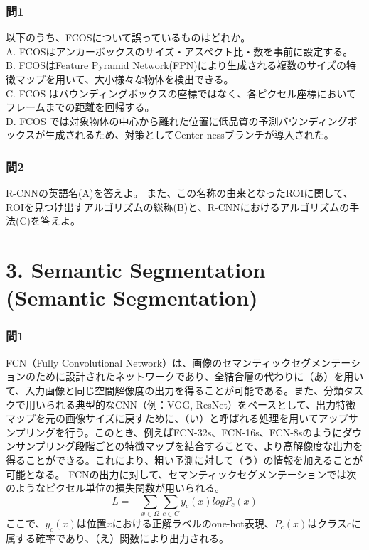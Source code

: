 \documentclass[
  letterpaper,
  DIV=11,
  numbers=noendperiod]{scrreprt}
\begin{document}
\subsection{問1}\label{ux554f1-3}

以下のうち、FCOSについて誤っているものはどれか。\\
A. FCOSはアンカーボックスのサイズ・アスペクト比・数を事前に設定する。\\
B. FCOSはFeature Pyramid
Network(FPN)により生成される複数のサイズの特徴マップを用いて、大小様々な物体を検出できる。\\
C. FCOS
はバウンディングボックスの座標ではなく、各ピクセル座標においてフレームまでの距離を回帰する。\\
D. FCOS
では対象物体の中心から離れた位置に低品質の予測バウンディングボックスが生成されるため、対策としてCenter-nessブランチが導入された。

\subsection{問2}\label{ux554f2-1}

R-CNNの英語名(A)を答えよ。
また、この名称の由来となったROIに関して、ROIを見つけ出すアルゴリズムの総称(B)と、R-CNNにおけるアルゴリズムの手法(C)を答えよ。

\chapter{3. Semantic Segmentation (Semantic
Segmentation)}\label{semantic-segmentation-semantic-segmentation}

\subsection{問1}\label{ux554f1-4}

FCN（Fully Convolutional
Network）は、画像のセマンティックセグメンテーションのために設計されたネットワークであり、全結合層の代わりに（あ）を用いて、入力画像と同じ空間解像度の出力を得ることが可能である。また、分類タスクで用いられる典型的なCNN（例：VGG,
ResNet）をベースとして、出力特徴マップを元の画像サイズに戻すために、（い）と呼ばれる処理を用いてアップサンプリングを行う。このとき、例えばFCN-32s、FCN-16s、FCN-8sのようにダウンサンプリング段階ごとの特徴マップを結合することで、より高解像度な出力を得ることができる。これにより、粗い予測に対して（う）の情報を加えることが可能となる。
FCNの出力に対して、セマンティックセグメンテーションでは次のようなピクセル単位の損失関数が用いられる。
\[
𝐿=−∑_{𝑥∈Ω}∑_{c∈C}y_c(x)logP_c(x)
\]
ここで、\(y_c(x)\)は位置\(x\)における正解ラベルのone-hot表現、\(P_c(x)\)はクラス\(c\)に属する確率であり、（え）関数により出力される。
\end{document}
